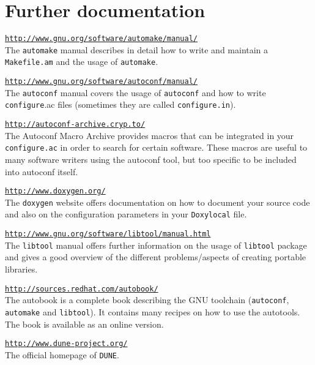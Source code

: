\documentclass[11pt,a4paper,headinclude,footinclude,DIV16,normalheadings]{scrartcl}
\newcommand{\dune}{\texttt{DUNE}\xspace}
\newcommand{\autoconf}{\texttt{autoconf}\xspace}
\newcommand{\automake}{\texttt{automake}\xspace}
\newcommand{\libtool}{\texttt{libtool}\xspace}
\newcommand{\configure}{\texttt{configure}\xspace}
\newcommand{\configureac}{\texttt{configure.ac}\xspace}
\newcommand{\makefileam}{\texttt{Makefile.am}\xspace}
\begin{document}
\section{Further documentation}

\texttt{\url{http://www.gnu.org/software/automake/manual/}}\\
The \automake manual describes in detail how to write and maintain a
\makefileam and the usage of \automake.

\texttt{\url{http://www.gnu.org/software/autoconf/manual/}}\\
The \autoconf manual covers the usage of \autoconf and how to write
\configure.ac files (sometimes they are called \texttt{configure.in}).

\texttt{\url{http://autoconf-archive.cryp.to/}}\\
The Autoconf Macro Archive provides macros that can be integrated in
your \configureac in order to search for certain software. These
macros are useful to many software writers using the autoconf tool, but too
specific to be included into autoconf itself.

\texttt{\url{http://www.doxygen.org/}}\\
The \texttt{doxygen} website offers documentation on how to document
your source code and also on the configuration parameters in your
\texttt{Doxylocal} file.

\texttt{\url{http://www.gnu.org/software/libtool/manual.html}}\\
The \libtool manual offers further information on the usage of
\libtool package and gives a good overview of the different
problems/aspects of creating portable libraries.

\texttt{\url{http://sources.redhat.com/autobook/}}\\
The autobook is a complete book describing the GNU toolchain
(\autoconf, \automake and \libtool). It contains many recipes on how
to use the autotools. The book is available as an online 
version.

\texttt{\url{http://www.dune-project.org/}}\\
The official homepage of \dune.
\end{document}
